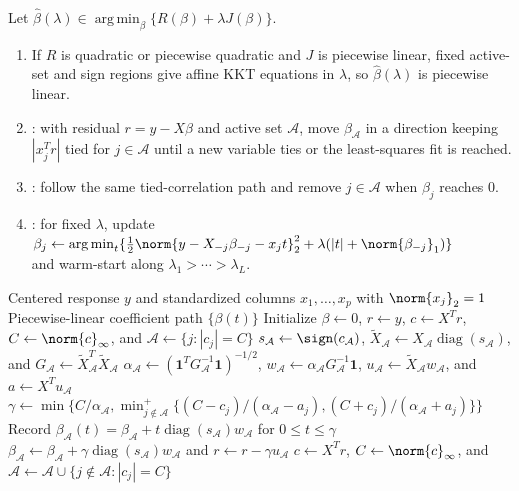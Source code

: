 \begin{method} \label{meth:sl-piecewise-linear-paths} \\
Let $\widehat{\beta}(\lambda)\in\operatorname*{arg\,min}_{\beta}\{R(\beta)+\lambda J(\beta)\}$.
\begin{enumerate}[label=(\roman*)]
\setlength{\itemsep}{0pt}
\item If $R$ is quadratic or piecewise quadratic and $J$ is piecewise linear, fixed active-set and sign regions give affine KKT equations in $\lambda$, so $\widehat{\beta}(\lambda)$ is piecewise linear.
\item {}: with residual $r=y-X\beta$ and active set $\mathcal{A}$, move $\beta_{\mathcal{A}}$ in a direction keeping $|x_j^Tr|$ tied for $j\in\mathcal{A}$ until a new variable ties or the least-squares fit is reached.
\item {}: follow the same tied-correlation path and remove $j\in\mathcal{A}$ when $\beta_j$ reaches $0$.
\item {}: for fixed $\lambda$, update $\beta_j\gets\operatorname*{arg\,min}_{t}\{\frac12\norm{y-X_{-j}\beta_{-j}-x_jt}_2^2+\lambda(|t|+\norm{\beta_{-j}}_1)\}$\\
and warm-start along $\lambda_1>\cdots>\lambda_L$.
\end{enumerate}
\end{method}

\begin{breakablealgorithm}
\caption{Least Angle Regression Path}
\label{alg:sl-least-angle-regression-path}
\begin{algorithmic}
\Require Centered response $y$ and standardized columns $x_1,\ldots,x_p$ with $\norm{x_j}_2=1$
\Ensure Piecewise-linear coefficient path $\{\beta(t)\}$
\State Initialize $\beta\gets0$, $r\gets y$, $c\gets X^Tr$, $C\gets\norm{c}_\infty$, and $\mathcal{A}\gets\{j:|c_j|=C\}$
\Repeat
\State $s_{\mathcal{A}}\gets\sign(c_{\mathcal{A}})$, $\widetilde{X}_{\mathcal{A}}\gets X_{\mathcal{A}}\operatorname{diag}(s_{\mathcal{A}})$, and $G_{\mathcal{A}}\gets\widetilde{X}_{\mathcal{A}}^T\widetilde{X}_{\mathcal{A}}$
\State $\alpha_{\mathcal{A}}\gets(\mathbf{1}^TG_{\mathcal{A}}^{-1}\mathbf{1})^{-1/2}$, $w_{\mathcal{A}}\gets\alpha_{\mathcal{A}}G_{\mathcal{A}}^{-1}\mathbf{1}$, $u_{\mathcal{A}}\gets\widetilde{X}_{\mathcal{A}}w_{\mathcal{A}}$, and $a\gets X^Tu_{\mathcal{A}}$
\State $\gamma\gets\min\{C/\alpha_{\mathcal{A}},\min_{j\notin\mathcal{A}}^+\{(C-c_j)/(\alpha_{\mathcal{A}}-a_j),(C+c_j)/(\alpha_{\mathcal{A}}+a_j)\}\}$
\State Record $\beta_{\mathcal{A}}(t)=\beta_{\mathcal{A}}+t\operatorname{diag}(s_{\mathcal{A}})w_{\mathcal{A}}$ for $0\leq t\leq\gamma$
\State $\beta_{\mathcal{A}}\gets\beta_{\mathcal{A}}+\gamma\operatorname{diag}(s_{\mathcal{A}})w_{\mathcal{A}}$ and $r\gets r-\gamma u_{\mathcal{A}}$
\State $c\gets X^Tr$, $C\gets\norm{c}_\infty$, and $\mathcal{A}\gets\mathcal{A}\cup\{j\notin\mathcal{A}:|c_j|=C\}$
\end{algorithmic}
\end{breakablealgorithm}

